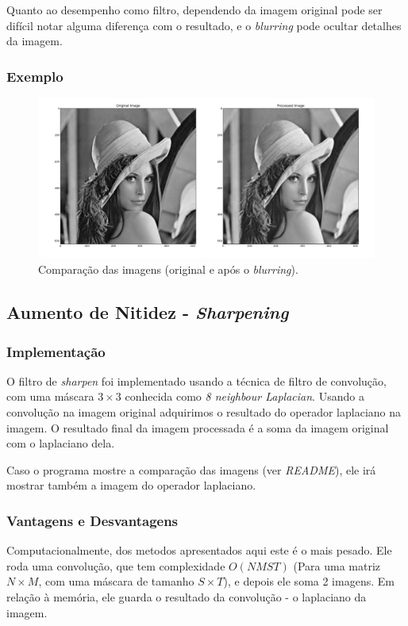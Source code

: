 Quanto ao desempenho como filtro, dependendo da imagem original pode ser difícil notar alguma diferença com o 
resultado, e o \textit{blurring} pode ocultar detalhes da imagem.

\subsubsection{Exemplo}
\begin{figure}[htb]
    \centering
    \includegraphics[width=1.0\textwidth]{blur_example.png}
    \caption{Comparação das imagens (original e após o \textit{blurring}).}
    \label{fig:ex_blur}
\end{figure}

\pagebreak

\subsection{Aumento de Nitidez - \textit{Sharpening}}
\subsubsection{Implementação}
O filtro de \textit{sharpen} foi implementado usando a técnica de filtro de convolução, com uma máscara $3\times 3$
conhecida como \textit{8 neighbour Laplacian}. Usando a convolução na imagem original adquirimos o resultado do operador
laplaciano na imagem. O resultado final da imagem processada é a soma da imagem original com o laplaciano dela.

Caso o programa mostre a comparação das imagens (ver \textit{README}), ele irá mostrar também a imagem do operador 
laplaciano. 

\subsubsection{Vantagens e Desvantagens}
Computacionalmente, dos metodos apresentados aqui este é o mais pesado. Ele roda uma convolução, que tem complexidade 
$O(NMST)$ (Para uma matriz $N\times M$, com uma máscara de tamanho $S\times T$), e depois ele soma 2 imagens. Em
relação à memória, ele guarda o resultado da convolução - o laplaciano da imagem.

